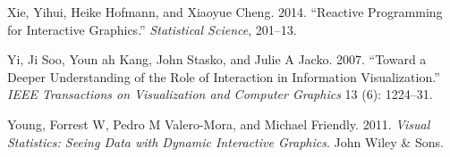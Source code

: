 \documentclass[
]{book}
\newlength{\cslhangindent}
\newenvironment{CSLReferences}[2] %
 {\begin{list}{}{%
  \setlength{\itemindent}{0pt}
  \setlength{\leftmargin}{0pt}
  \setlength{\parsep}{0pt}
  \ifodd #1
   \setlength{\leftmargin}{\cslhangindent}
   \setlength{\itemindent}{-1\cslhangindent}
  \fi
  \setlength{\itemsep}{#2\baselineskip}}}
 {\end{list}}
\begin{document}
\begin{CSLReferences}{1}{0}
Xie, Yihui, Heike Hofmann, and Xiaoyue Cheng. 2014. {``Reactive Programming for Interactive Graphics.''} \emph{Statistical Science}, 201--13.

Yi, Ji Soo, Youn ah Kang, John Stasko, and Julie A Jacko. 2007. {``Toward a Deeper Understanding of the Role of Interaction in Information Visualization.''} \emph{IEEE Transactions on Visualization and Computer Graphics} 13 (6): 1224--31.

Young, Forrest W, Pedro M Valero-Mora, and Michael Friendly. 2011. \emph{Visual Statistics: Seeing Data with Dynamic Interactive Graphics}. John Wiley \& Sons.

\end{CSLReferences}
\end{document}
